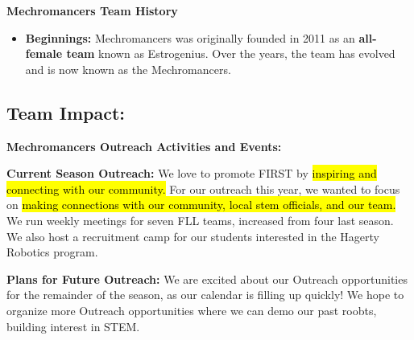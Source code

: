 \textbf{\Large Mechromancers Team History}

\begin{itemize}
\item \textbf{Beginnings:}  Mechromancers was originally founded in 2011 as an \textbf{all-female team} known as Estrogenius.  Over the years, the team has evolved and is now known as the Mechromancers.
\end{itemize}

\clearpage
{}
\subsection*{\textbf{\Huge Team Impact:}}
\vspace{.2cm}
\setlength{\parindent}{.25in} 

\textbf{\Large Mechromancers Outreach Activities and Events:}

\textbf{Current Season Outreach:} We love to promote FIRST by \hl{inspiring and connecting with our community.} For our outreach this year, we wanted to focus on \hl{making connections with our community, local stem officials, and our team.} We run weekly meetings for seven FLL teams, increased from four last season. We also host a recruitment camp for our students interested in the Hagerty Robotics program.


\textbf{Plans for Future Outreach:} We are excited about our Outreach opportunities for the remainder of the season, as our calendar is filling up quickly! We hope to organize more Outreach opportunities where we can demo our past roobts, building interest in STEM.


